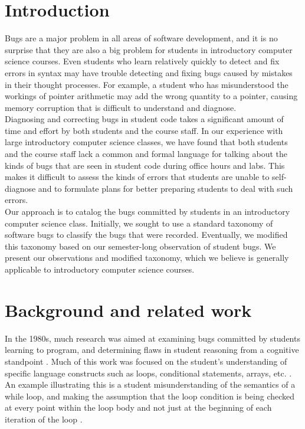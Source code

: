 \documentclass{sig-alternate}
\begin{document}
\section{Introduction}
\label{sec:intro}

Bugs are a major problem in all areas of software development, and it
is no surprise that they are also a big problem for students in
introductory computer science courses. Even students who learn
relatively quickly to detect and fix errors in syntax may have trouble
detecting and fixing bugs caused by mistakes in their thought
processes.  For example, a student who has misunderstood the workings
of pointer arithmetic may add the wrong quantity to a pointer, causing
memory corruption that is difficult to understand and diagnose.\\

Diagnosing and correcting bugs in student code takes a significant
amount of time and effort by both students and the course staff. In
our experience with large introductory computer science classes, we
have found that both students and the course staff lack a common and
formal language for talking about the kinds of bugs that are seen in
student code during office hours and labs. This makes it difficult to
assess the kinds of errors that students are unable to self-diagnose
and to formulate plans for better preparing students to deal with such
errors.\\

Our approach is to catalog the bugs committed by students in an
introductory computer science class. Initially, we sought to use a
standard taxonomy of software bugs \cite{IEEE10} to classify the bugs
that were recorded. Eventually, we modified this taxonomy based on our
semester-long observation of student bugs. We present our observations
and modified taxonomy, which we believe is generally applicable to
introductory computer science courses.

\section{Background and related work}
\label{sec:background}

In the 1980s, much research was aimed at examining bugs committed by
students learning to program, and determining flaws in student
reasoning from a cognitive standpoint
\cite{JoniSolowayGoldmanEhrlich83, Pea86, PutnamSleemanBaxterKuspa86,
SpohrerSoloway86}. Much of this work was focused on the student's
understanding of specific language constructs such as loops,
conditional statements, arrays, etc.
\cite{JoniSolowayGoldmanEhrlich83, Pea86, PutnamSleemanBaxterKuspa86}.
An example illustrating this is a student misunderstanding of the
semantics of a while loop, and making the assumption that the loop
condition is being checked at every point within the loop body and not
just at the beginning of each iteration of the loop \cite{Pea86}.\\
\end{document}
